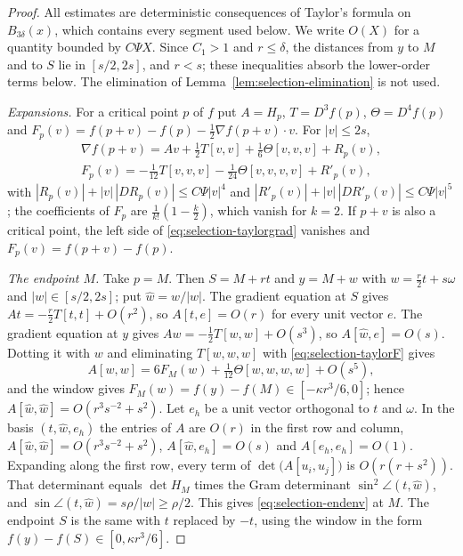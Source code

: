 \begin{proof}
All estimates are deterministic consequences of Taylor's formula on $B_{3\delta}(x)$, which contains every segment used below. We write $O(X)$ for a quantity bounded by $C\Psi X$. Since $C_1>1$ and $r\le\delta$, the distances from $y$ to $M$ and to $S$ lie in $[s/2,2s]$, and $r<s$; these inequalities absorb the lower-order terms below. The elimination of Lemma~\ref{lem:selection-elimination} is not used.

\emph{Expansions.} For a critical point $p$ of $f$ put $A=H_p$, $T=D^3f(p)$, $\Theta=D^4f(p)$ and $F_p(v)=f(p+v)-f(p)-\frac12\nabla f(p+v)\cdot v$. For $|v|\le2s$,
\begin{gather}
\nabla f(p+v)=Av+\tfrac12T[v,v]+\tfrac16\Theta[v,v,v]+R_p(v),\label{eq:selection-taylorgrad}\\
F_p(v)=-\tfrac1{12}T[v,v,v]-\tfrac1{24}\Theta[v,v,v,v]+R'_p(v),\label{eq:selection-taylorF}
\end{gather}
with $|R_p(v)|+|v|\,|DR_p(v)|\le C\Psi|v|^4$ and $|R'_p(v)|+|v|\,|DR'_p(v)|\le C\Psi|v|^5$; the coefficients of $F_p$ are $\frac1{k!}(1-\frac k2)$, which vanish for $k=2$. If $p+v$ is also a critical point, the left side of \eqref{eq:selection-taylorgrad} vanishes and $F_p(v)=f(p+v)-f(p)$.

\emph{The endpoint $M$.} Take $p=M$. Then $S=M+rt$ and $y=M+w$ with $w=\frac r2t+s\omega$ and $|w|\in[s/2,2s]$; put $\hat w=w/|w|$. The gradient equation at $S$ gives $At=-\frac r2T[t,t]+O(r^2)$, so $A[t,e]=O(r)$ for every unit vector $e$. The gradient equation at $y$ gives $Aw=-\frac12T[w,w]+O(s^3)$, so $A[\hat w,e]=O(s)$. Dotting it with $w$ and eliminating $T[w,w,w]$ with \eqref{eq:selection-taylorF} gives
\[
A[w,w]=6F_M(w)+\tfrac1{12}\Theta[w,w,w,w]+O(s^5),
\]
and the window gives $F_M(w)=f(y)-f(M)\in[-\kappa r^3/6,0]$; hence $A[\hat w,\hat w]=O(r^3s^{-2}+s^2)$. Let $e_h$ be a unit vector orthogonal to $t$ and $\omega$. In the basis $(t,\hat w,e_h)$ the entries of $A$ are $O(r)$ in the first row and column, $A[\hat w,\hat w]=O(r^3s^{-2}+s^2)$, $A[\hat w,e_h]=O(s)$ and $A[e_h,e_h]=O(1)$. Expanding along the first row, every term of $\det\bigl(A[u_i,u_j]\bigr)$ is $O(r(r+s^2))$. That determinant equals $\det H_M$ times the Gram determinant $\sin^2\angle(t,\hat w)$, and $\sin\angle(t,\hat w)=s\rho/|w|\ge\rho/2$. This gives \eqref{eq:selection-endenv} at $M$. The endpoint $S$ is the same with $t$ replaced by $-t$, using the window in the form $f(y)-f(S)\in[0,\kappa r^3/6]$.


\end{proof}
